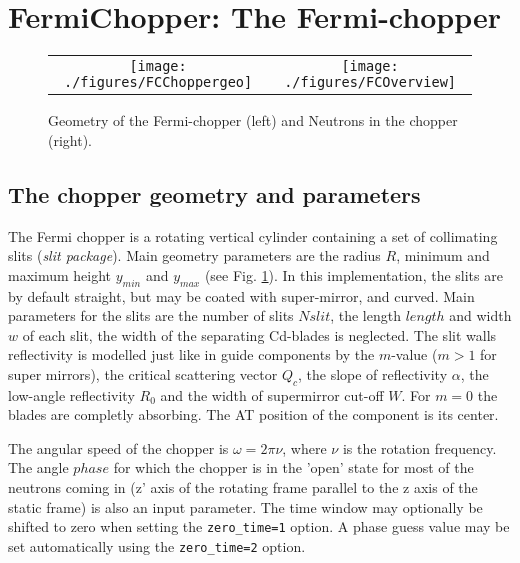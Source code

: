 \section{FermiChopper: The Fermi-chopper}


\begin{figure}
\begin{center}
\begin{tabular}{cc}
\texttt{[image: ./figures/FCChoppergeo]}
&
\texttt{[image: ./figures/FCOverview]}
\end{tabular}
\end{center}
\caption{Geometry of the Fermi-chopper (left) and Neutrons in the chopper (right).}
\label{fig:Overview}
\end{figure}

\subsection{The chopper geometry and parameters}
\label{ssec:chopper}

The Fermi chopper is a rotating vertical cylinder containing a set of collimating slits (\emph{slit package}). Main geometry parameters are the radius $R$, minimum and maximum height $y_{min}$ and $y_{max}$ (see Fig. \ref{fig:Overview}).
In this implementation, the slits are by default straight, but may be coated with super-mirror, and curved. Main parameters for the slits are the number of slits $Nslit$, the length $length$ and width $w$ of each slit, the width of the separating Cd-blades is neglected. The slit walls reflectivity is modelled just like in guide components by the $m$-value ($m > 1$ for super mirrors), the critical scattering vector $Q_c$, the slope of reflectivity $\alpha$, the low-angle reflectivity $R_0$ and the width of supermirror cut-off $W$. For $m=0$ the blades are completly absorbing. The AT position of the component is its center.

The angular speed of the chopper is $\omega = 2\pi \nu$, where $\nu$ is the rotation frequency. The angle $phase$ for which the chopper is in the 'open' state for most of the neutrons coming in (z' axis of the rotating frame parallel to the z axis of the static frame) is also an input parameter. The time window may optionally be shifted to zero when setting the \verb+zero_time=1+ option. A phase guess value may be set automatically using the \verb+zero_time=2+ option.

